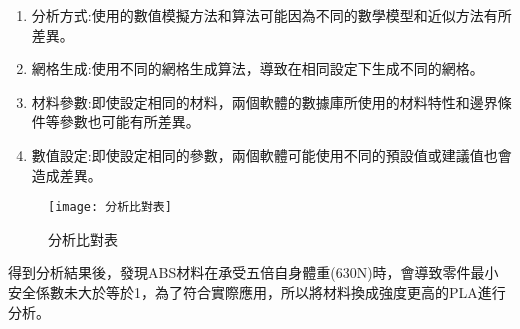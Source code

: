\begin{enumerate}
\item 分析方式:使用的數值模擬方法和算法可能因為不同的數學模型和近似方法有所差異。
\item 網格生成:使用不同的網格生成算法，導致在相同設定下生成不同的網格。
\item 材料參數:即使設定相同的材料，兩個軟體的數據庫所使用的材料特性和邊界條件等參數也可能有所差異。
\item	數值設定:即使設定相同的參數，兩個軟體可能使用不同的預設值或建議值也會造成差異。\\

\end{enumerate}

\begin{figure}[hbt!]
\center
\texttt{[image: 分析比對表]}
\caption{\Large 分析比對表}
\label{分析比對表}
\end{figure}

\begin{table}[htb!]
  \center\large
  \caption{\Large ABS最大等效應力(MPa)}
\end{table}   

得到分析結果後，發現ABS材料在承受五倍自身體重(630N)時，會導致零件最小安全係數未大於等於1，為了符合實際應用，所以將材料換成強度更高的PLA進行分析。\\


\begin{table}[htb!]
  \center
  \large
  \caption{\Large PLA最大等效應力(MPa)}
\end{table}

\begin{table}[htb!]
  \center\large
  \caption{\Large PLA最小安全係數}
\end{table}

\newpage
